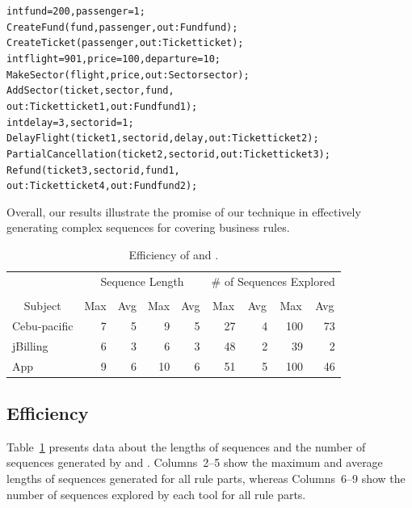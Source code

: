 {\scriptsize
\begin{alltt}
 int fund = 200, passenger = 1;
 CreateFund(fund, passenger, out: Fund fund);
 CreateTicket(passenger, out: Ticket ticket);
 int flight = 901, price = 100, departure = 10; 
 MakeSector(flight, price, out: Sector sector);
 AddSector(ticket, sector, fund,  
                out: Ticket ticket1, out: Fund fund1);
 int delay = 3, sectorid = 1; 
 DelayFlight(ticket1, sectorid, delay, out: Ticket ticket2);
 PartialCancellation(ticket2, sectorid, out: Ticket ticket3);
 Refund(ticket3, sectorid, fund1, 
                out: Ticket ticket4, out: Fund fund2);
\end{alltt}
}

Overall, our results illustrate the promise of our technique in effectively
generating complex sequences for covering business rules.

\begin{table}[t]
\caption{Efficiency of \tool{} and \exhaust{}.}
\centering
{\scriptsize
\tabcolsep=3pt
\begin{tabular}{|l|r|r|r|r|r|r|r|r|}
\hline
& \multicolumn{4}{|c|}{Sequence Length} & \multicolumn{4}{|c|}{\# of Sequences Explored} \\
\cline{2-9}
& \multicolumn{2}{|c|}{\tool{}} & \multicolumn{2}{|c|}{\exhaust{}} & \multicolumn{2}{|c|}{\tool{}} & \multicolumn{2}{|c|}{\exhaust{}}  \\
\cline{2-9}
\multicolumn{1}{|c|}{Subject} & \multicolumn{1}{|c|}{Max} & \multicolumn{1}{|c|}{Avg} & \multicolumn{1}{|c|}{Max} & \multicolumn{1}{|c|}{Avg} & \multicolumn{1}{|c|}{Max} & \multicolumn{1}{|c|}{Avg} & \multicolumn{1}{|c|}{Max} & \multicolumn{1}{|c|}{Avg} \\
\hline \hline
Cebu-pacific 	 &  7		& 5 &  9 &  5	 &  27 &  4	&  100 & 73 \\
jBilling		 	 &  6		& 3 &  6 &  3	 &  48 &  2	&  39  &  2 \\
App					 	 &  9		& 6 & 10 &  6	 &  51 &  5	& 100  & 46 \\
\hline
\end{tabular}
}
\label{tab:stats}
\end{table}

\subsection{Efficiency}

Table~\ref{tab:stats} presents data about the lengths of sequences and the
number of sequences generated by \tool{} and \exhaust{}. Columns~2--5 show the
maximum and average lengths of sequences generated for all rule parts, whereas
Columns~6--9 show the number of sequences explored by each tool for all rule
parts.

